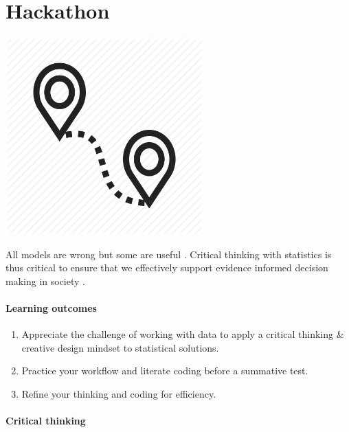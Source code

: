 \documentclass[
]{book}
\providecommand{\tightlist}{%
  \setlength{\itemsep}{0pt}\setlength{\parskip}{0pt}}
\begin{document}
\hypertarget{hackathon}{%
\chapter{Hackathon}\label{hackathon}}

\includegraphics[width=3in,height=\textheight]{./hackathon.png}

All models are wrong but some are useful \citep{RN6467, RN7258}. Critical thinking with statistics is thus critical to ensure that we effectively support evidence informed decision making in society \citep{RN6861, RN7180}.

\hypertarget{learning-outcomes-5}{%
\subsubsection*{Learning outcomes}\label{learning-outcomes-5}}

\begin{enumerate}
\def\labelenumi{\arabic{enumi}.}
\tightlist
\item
  Appreciate the challenge of working with data to apply a critical thinking \& creative design mindset to statistical solutions.\\
\item
  Practice your workflow and literate coding before a summative test.\\
\item
  Refine your thinking and coding for efficiency.
\end{enumerate}

\hypertarget{critical-thinking-4}{%
\subsubsection*{Critical thinking}\label{critical-thinking-4}}
\end{document}
